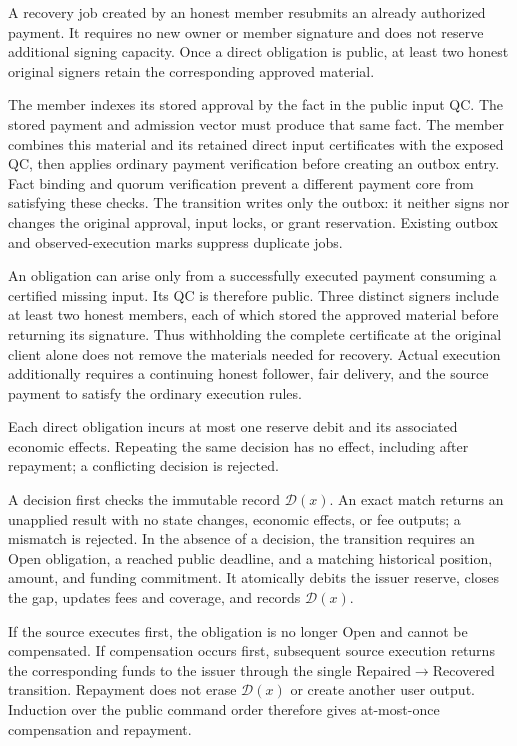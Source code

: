 \begin{lemma}
\label{lem:c3-recovery-authority}
A recovery job created by an honest member resubmits an already authorized
payment. It requires no new owner or member signature and does not reserve
additional signing capacity. Once a direct obligation is public, at least
two honest original signers retain the corresponding approved material.
\end{lemma}
\begin{IEEEproof}
The member indexes its stored approval by the fact in the public input QC.
The stored payment and admission vector must produce that same fact. The
member combines this material and its retained direct input certificates
with the exposed QC, then applies ordinary payment verification before
creating an outbox entry. Fact binding and quorum verification prevent a
different payment core from satisfying these checks. The transition writes
only the outbox: it neither signs nor changes the original approval, input
locks, or grant reservation. Existing outbox and observed-execution marks
suppress duplicate jobs.

An obligation can arise only from a successfully executed payment consuming
a certified missing input. Its QC is therefore public. Three distinct
signers include at least two honest members, each of which stored the
approved material before returning its signature. Thus withholding the
complete certificate at the original client alone does not remove the
materials needed for recovery. Actual execution additionally requires a
continuing honest follower, fair delivery, and the source payment to satisfy
the ordinary execution rules.
\end{IEEEproof}

\begin{lemma}
\label{lem:c3-decision-once}
Each direct obligation incurs at most one reserve debit and its associated
economic effects. Repeating the same decision has no effect, including
after repayment; a conflicting decision is rejected.
\end{lemma}
\begin{IEEEproof}
A decision first checks the immutable record $\mathcal D(x)$. An exact
match returns an unapplied result with no state changes, economic effects,
or fee outputs; a mismatch is rejected. In the absence of a decision, the
transition requires an \textsf{Open} obligation, a reached public deadline,
and a matching historical position, amount, and funding commitment. It
atomically debits the issuer reserve, closes the gap, updates fees and
coverage, and records $\mathcal D(x)$.

If the source executes first, the obligation is no longer \textsf{Open} and
cannot be compensated. If compensation occurs first, subsequent source
execution returns the corresponding funds to the issuer through the single
\textsf{Repaired}$\rightarrow$\textsf{Recovered} transition. Repayment does
not erase $\mathcal D(x)$ or create another user output. Induction over the
public command order therefore gives at-most-once compensation and
repayment.
\end{IEEEproof}

